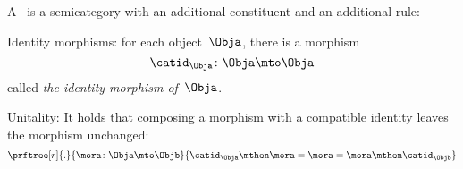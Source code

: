 


%
%
\begin{ctdefinition}[Category]
	\label{def:categorymain}
	A \emph{}~\CatC is a semicategory with an additional constituent and an additional rule:
	\begin{body}
		\constit
		\begin{compactenum}
			\item Identity morphisms: for each object~$\Obja$, there is a morphism
			\begin{equation}
				\catid_{\Obja}\colon \Obja \mto \Obja
			\end{equation}
			called \emph{the identity morphism of~$\Obja$}.
		\end{compactenum}
		\condit
		\begin{compactenum}
			\item Unitality: It holds that composing a morphism with a compatible identity leaves the morphism unchanged:
			\begin{equation}
				\prftree[r]{.}{\mora \colon \Obja \mto \Objb}{\catid_\Obja \mthen \mora= \mora = \mora \mthen \catid_\Objb}
			\end{equation}
		\end{compactenum}
	\end{body}
\end{ctdefinition}

